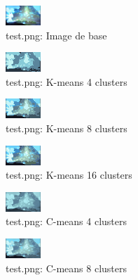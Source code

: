 \documentclass{article}
\begin{document}

  \begin{figure}[h]
    \centering
    \includegraphics[scale=8]{images/test.png}
    \caption{test.png: Image de base}
    \label{fig:}
  \end{figure}

  \begin{figure}[h]
    \centering
    \includegraphics[scale=6]{images/result_test_k_4.png}
    \caption{test.png: K-means 4 clusters}
    \label{fig:}
  \end{figure}

  \begin{figure}[h]
    \centering
    \includegraphics[scale=6]{images/result_test_k_8.png}
    \caption{test.png: K-means 8 clusters}
    \label{fig:}
  \end{figure}

  \begin{figure}[h]
    \centering
    \includegraphics[scale=6]{images/result_test_k_16.png}
    \caption{test.png: K-means 16 clusters}
    \label{fig:}
  \end{figure}

  \begin{figure}[h]
    \centering
    \includegraphics[scale=6]{images/result_test_c_4.png}
    \caption{test.png: C-means 4 clusters}
    \label{fig:}
  \end{figure}

  \begin{figure}[h]
    \centering
    \includegraphics[scale=6]{images/result_test_c_8.png}
    \caption{test.png: C-means 8 clusters}
    \label{fig:}
  \end{figure}
\end{document}
